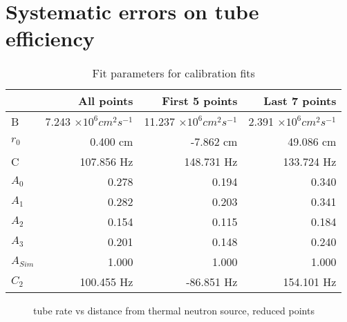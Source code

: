 \chapter{Systematic errors on \He tube efficiency}
\label{chap:calibUn}

\begin{table}[htb]
	\centering
	\begin{tabular}{ lrrr }
			&	All points		&	First 5 points		&	Last 7 points		\\	\hline \hline
	B		&	7.243	$\times10^{6}cm^2s^{-1}$	&	11.237	$\times10^{6}cm^2s^{-1}$	&	2.391	$\times10^{6}cm^2s^{-1}$	\\	
$	r_{0}	$	&	0.400	cm	&	-7.862	cm	&	49.086	cm	\\	
	C		&	107.856	Hz	&	148.731	Hz	&	133.724	Hz	\\	
$	A_{0}	$	&	0.278		&	0.194		&	0.340		\\	
$	A_{1}	$	&	0.282		&	0.203		&	0.341		\\	
$	A_{2}	$	&	0.154		&	0.115		&	0.184		\\	
$	A_{3}	$	&	0.201		&	0.148		&	0.240		\\	
$	A_{Sim}	$	&	1.000		&	1.000		&	1.000		\\	
$	C_{2}	$	&	100.455	Hz	&	-86.851	Hz	&	154.101	Hz	\\	\hline

	\end{tabular}
	\caption{Fit parameters for calibration fits}
	\label{tab:CalibrationFitPars}
\end{table}




\begin{figure}
	\centering
	\caption{\He tube rate vs distance from thermal neutron source, reduced points}
	\label{fig:he3rateVsDReduced}
\end{figure}
